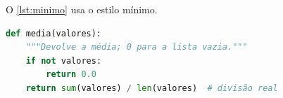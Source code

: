\documentclass[12pt, a4paper, brazilian]{abntex2}
\begin{document}
O \autoref{lst:minimo} usa o estilo mínimo.

\begin{lstlisting}[language=Python, caption={Média com o estilo mínimo},
    label={lst:minimo}]
def media(valores):
    """Devolve a média; 0 para a lista vazia."""
    if not valores:
        return 0.0
    return sum(valores) / len(valores)  # divisão real
\end{lstlisting}
\end{document}
